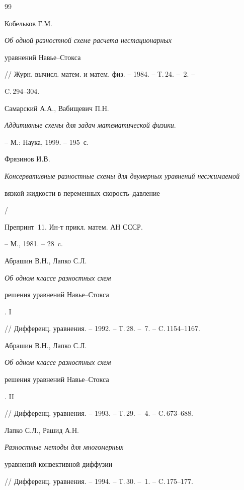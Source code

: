 \begin{thebibliography}{99}


Кобельков Г.М. {\em Об одной разностной схеме расчета нестационарных


уравнений Навье--Стокса}


// Журн. вычисл. матем. и матем. физ. -- 1984. -- Т.\,24. -- \No\,2. --


C.\,294--304.







Самарский А.А., Вабищевич П.Н. 


{\em Аддитивные схемы для задач математической физики}.


-- М.: Наука, 1999. -- 195~с.







Фрязинов И.В.


{\em Консервативные разностные схемы для двумерных уравнений несжимаемой


вязкой жидкости в переменных скорость--давление} /


Препринт \No\,11. Ин-т прикл. матем. АН СССР.


-- М., 1981. -- 28~c. 







Абрашин В.Н., Лапко С.Л. {\em Об одном классе разностных схем 


решения уравнений Навье--Стокса}. I


// Дифференц. уравнения. -- 1992. -- Т.\,28. -- \No\,7. -- C.\,1154--1167.







Абрашин В.Н., Лапко С.Л. {\em Об одном классе разностных схем 


решения уравнений Навье--Стокса}. II


// Дифференц. уравнения. -- 1993. -- Т.\,29. -- \No\,4. -- C.\,673--688.







Лапко С.Л., Рашид А.Н. {\em Разностные методы для многомерных 


уравнений конвективной диффузии}


// Дифференц. уравнения. -- 1994. -- Т.\,30. -- \No\,1. -- C.\,175--177.





\end{thebibliography}





